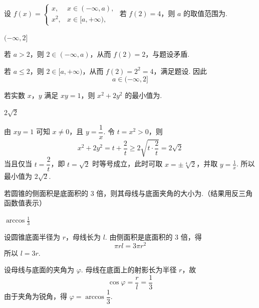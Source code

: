 \begin{problem}
设 \( f(x) = \begin{cases}
x, & x \in (-\infty, a),\\
x^2, & x \in [a, +\infty),
\end{cases} \) 若 \( f(2) = 4 \)，则 \( a \) 的取值范围为\fillinblank{}.
\end{problem}

\begin{answer}
\((-\infty,2]\)
\end{answer}

\begin{solution}
若 \(a>2\)，则 \(2\in(-\infty,a)\)，从而 \(f(2)=2\)，与题设矛盾.

若 \(a\leqslant2\)，则 \(2\in[a,+\infty)\)，从而 \(f(2)=2^2=4\)，满足题设. 因此
\[
a\in(-\infty,2]
\]
\end{solution}

\begin{problem}
若实数 \(x\)，\(y\) 满足 \(xy = 1\)，则 \(x^2 + 2y^2\) 的最小值为\fillinblank{}.
\end{problem}

\begin{answer}
\(2\sqrt{2}\)
\end{answer}

\begin{solution}
由 \(xy=1\) 可知 \(x\neq0\)，且 \(y=\dfrac1x\). 令 \(t=x^2>0\)，则
\[
x^2+2y^2=t+\frac2t\geqslant2\sqrt{t\cdot\frac2t}=2\sqrt2
\]
当且仅当 \(t=\dfrac2t\)，即 \(t=\sqrt2\) 时等号成立，此时可取 \(x=\pm\sqrt[4]{2}\)，并取 \(y=\frac{1}{x}\). 所以最小值为 \(2\sqrt2\).
\end{solution}

\begin{problem}
若圆锥的侧面积是底面积的 \(3\text{ 倍}\)，则其母线与底面夹角的大小为\fillinblank{}.（结果用反三角函数值表示）
\end{problem}

\begin{answer}
\(\arccos\frac{1}{3}\)
\end{answer}

\begin{solution}
设圆锥底面半径为 \(r\)，母线长为 \(l\). 由侧面积是底面积的 \(3\) 倍，得
\[
\pi rl=3\pi r^2
\]
所以 \(l=3r\).

设母线与底面的夹角为 \(\varphi\). 母线在底面上的射影长为半径 \(r\)，故
\[
\cos\varphi=\frac rl=\frac13
\]
由于夹角为锐角，得 \(\varphi=\arccos\dfrac13\).
\end{solution}

